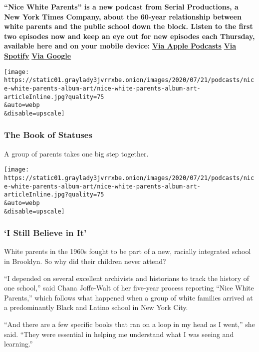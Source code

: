 \textbf{``Nice White Parents'' is a new podcast from Serial Productions,
a New York Times Company, about the 60-year relationship between white
parents and the public school down the block. Listen to the first two
episodes now and keep an eye out for new episodes each Thursday,
available here and on your mobile device:}
\textbf{\href{https://podcasts.apple.com/us/podcast/nice-white-parents/id1524080195}{Via
Apple Podcasts}} \textbf{\textbar{}}
\textbf{\href{https://open.spotify.com/show/7oBSLCZFCgpdCaBjIG8mLV?si=YcEPLD3xT2ejXmpQz-tRpw}{Via
Spotify}} \textbf{\textbar{}}
\textbf{\href{https://podcasts.google.com/feed/aHR0cHM6Ly9yc3MuYXJ0MTkuY29tL25pY2Utd2hpdGUtcGFyZW50cw}{Via
Google}}

\texttt{[image: https://static01.graylady3jvrrxbe.onion/images/2020/07/21/podcasts/nice-white-parents-album-art/nice-white-parents-album-art-articleInline.jpg?quality=75\\\&auto=webp\\\&disable=upscale]}

\hypertarget{the-book-of-statuses}{%
\subsubsection{The Book of Statuses}\label{the-book-of-statuses}}

A group of parents takes one big step together.

\texttt{[image: https://static01.graylady3jvrrxbe.onion/images/2020/07/21/podcasts/nice-white-parents-album-art/nice-white-parents-album-art-articleInline.jpg?quality=75\\\&auto=webp\\\&disable=upscale]}

\hypertarget{i-still-believe-in-it}{%
\subsubsection{`I Still Believe in It'}\label{i-still-believe-in-it}}

White parents in the 1960s fought to be part of a new, racially
integrated school in Brooklyn. So why did their children never attend?

``I depended on several excellent archivists and historians to track the
history of one school,'' said Chana Joffe-Walt of her five-year process
reporting ``Nice White Parents,'' which follows what happened when a
group of white families arrived at a predominantly Black and Latino
school in New York City.

``And there are a few specific books that ran on a loop in my head as I
went,'' she said. ``They were essential in helping me understand what I
was seeing and learning.''

